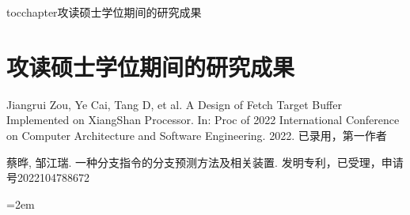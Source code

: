 
\newenvironment{thepublications}{\wuhao\song}

\addcontentsline{toc}{chapter}{攻读硕士学位期间的研究成果}%
\chapter*{\centering\xiaosan\hei\bfseries 攻读硕士学位期间的研究成果}

\begin{thepublications}

\setlength{\parindent}{0em}
\begin{publist}
	\item Jiangrui Zou, Ye Cai, Tang D, et al. A Design of Fetch Target Buffer Implemented on XiangShan Processor. In: Proc of 2022 International Conference on Computer Architecture and Software Engineering. 2022. 已录用，第一作者
	\item 蔡晔, 邹江瑞. 一种分支指令的分支预测方法及相关装置. 发明专利，已受理，申请号2022104788672
\end{publist}

\vfill
{}\hangindent=2em\noindent

\setlength{\parindent}{2em}

\end{thepublications}

